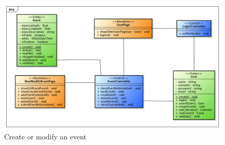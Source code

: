 \begin{center}
 \begin{figure}[H]
    \includegraphics[width=1\textwidth]{../BCEDiagram/BCE/EntityOverview/EventManagementBCE.png}
    \caption{Create or modify an event}
     \label{fig:editneweventBCE}
     \end{figure}
   \end{center}  

